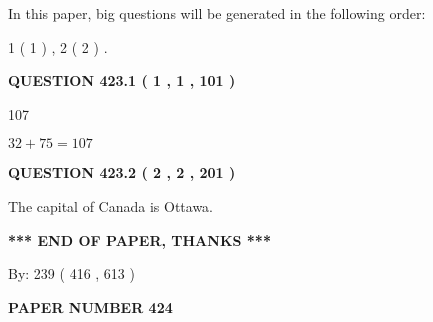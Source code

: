 \documentclass[12pt]{article}
\begin{document}
   
   
\vspace{0.2in}
   
In this paper, big questions will be generated in the following order: 
   
   
   1 ( 1 )
 ,
   2 ( 2 )
 .
  
\vspace{0.2in}
  
{\textbf{\Large{QUESTION
423.1 
 ( 1 , 1 , 101 )
}}}
  
  
 
 
\noindent{}

107
 
 
 
 
\noindent{}

$ %
32 +  %
75=   %
107$
 
 
  
\vspace{0.2in}
  
{\textbf{\Large{QUESTION
423.2 
 ( 2 , 2 , 201 )
}}}
  
  
 
 
\noindent{}
 
 
The capital of Canada is Ottawa.
 
 
 
 
   
   
 \vspace{0.2in}
 
   
   
   
   
\vspace{1.0in} 
{\textbf{\large{ *** END OF PAPER, THANKS *** }}} 
   
   
\hspace{1.0in} By: 
 239 ( 416 ,  613 )
   
   
   
   
\newpage 
\setcounter{page}{ 
   424001 } 
   
   
   
   
 {\textbf{ \Large{ PAPER NUMBER  424  }}}
   
   
\vspace{0.2in}
   
   
   
\end{document}
